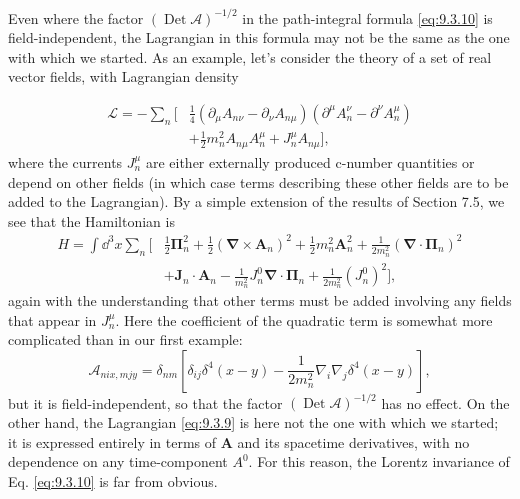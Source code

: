 \begin{sloppypar}
Even where the factor $(\operatorname{Det}\mathcal A)^{-1/2}$ in the
path-integral formula \eqref{eq:9.3.10} is field-independent, the Lagrangian in this
formula may not be the same as the one with which we started. As an example,
let's consider the theory of a set of real vector fields, with Lagrangian
density
\end{sloppypar}
\begin{align*}
\mathcal L=-\sum_n\biggl[&\frac14(\partial_\mu A_{n\nu}-\partial_\nu A_{n\mu})
 (\partial^\mu A_n^\nu-\partial^\nu A_n^\mu)
\\
&+\frac12m_n^2A_{n\mu}A_n^\mu+J_n^\mu A_{n\mu}\biggr],
\end{align*}
where the currents $J_n^\mu$ are either externally produced c-number
quantities or depend on other fields (in which case terms describing these
other fields are to be added to the Lagrangian). By a simple extension of the
results of Section 7.5, we see that the Hamiltonian is
\begin{align*}
H=\int \dd^3x\sum_n\biggl[&\frac12\boldsymbol\Pi_n^2
 +\frac12(\boldsymbol\nabla\times\mathbf A_n)^2
 +\frac12m_n^2\mathbf A_n^2
 +\frac{1}{2m_n^2}(\boldsymbol\nabla\cdot\boldsymbol\Pi_n)^2
\\
&+\mathbf J_n\cdot\mathbf A_n
 -\frac{1}{m_n^2}J_n^0\boldsymbol\nabla\cdot\boldsymbol\Pi_n
 +\frac{1}{2m_n^2}(J_n^0)^2\biggr],
\end{align*}
again with the understanding that other terms must be added involving any
fields that appear in $J_n^\mu$. Here the coefficient of the quadratic term is
somewhat more complicated than in our first example:
\[
\mathcal A_{nix,mjy}=\delta_{nm}\left[\delta_{ij}\delta^4(x-y)
 -\frac{1}{2m_n^2}\nabla_i\nabla_j\delta^4(x-y)\right],
\]
but it is field-independent, so that the factor
$(\operatorname{Det}\mathcal A)^{-1/2}$ has no effect. On the other hand, the
Lagrangian \eqref{eq:9.3.9} is here not the one with which we started; it is expressed
entirely in terms of $\mathbf A$ and its spacetime derivatives, with no
dependence on any time-component $A^0$. For this reason, the Lorentz invariance
of Eq. \eqref{eq:9.3.10} is far from obvious.

